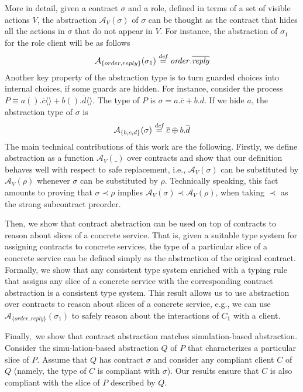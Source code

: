 \documentclass[submission,copyright,creativecommons]{eptcs}
\newcommand{\bydef}{\stackrel{\scriptstyle{\it def}}{=}}
\newcommand{\inp}[2]{#1(#2)}
\begin{document}
More in detail, given a contract $\sigma$  and a role, defined in terms of a set of visible actions $V$, 
the abstraction $\mathcal{A}_V(\sigma)$ of $\sigma$ can be thought as the contract that hides all the actions
in $\sigma$ that do not
appear in $V$. For instance, the abstraction of $\sigma_1$ for the role client will be as follows
\[
\mathcal{A}_{\{order, reply\}} (\sigma_1) \bydef {\it order}.\overline{\it reply}
\]
Another key property of the abstraction type is to turn guarded choices into internal choices, if some guards are hidden. For instance, consider the process $P \equiv \inp a{}.\overline c \langle \rangle + \inp b{}.\overline d \langle \rangle$. The type of $P$ is $\sigma = a.\overline c + b. \overline d$. If we hide $a$, the abstraction type of $\sigma$ is
\[ 
\mathcal{A}_{\{b,c,d\}} (\sigma) \bydef \overline c \oplus b. \overline d 
\]
The main technical contributions of this work are the following. Firstly, we define abstraction as a function $\mathcal{A}_V(\_)$ over contracts and show that our definition 
behaves well with respect to safe replacement, i.e.,  $\mathcal{A}_V(\sigma)$ can be substituted by $\mathcal{A}_V(\rho)$ 
whenever $\sigma$ can be substituted by $\rho$. Technically speaking, this fact amounts to proving that 
$\sigma \prec \rho$ implies $\mathcal{A}_V(\sigma)\prec \mathcal{A}_V(\rho)$,  when taking 
$\prec$ as the strong subcontract preorder.

Then, we show that contract abstraction can be used on top of contracts to reason about
 slices of a concrete service. That is, given a suitable type system for assigning 
contracts to concrete services, the type of a particular slice of a concrete 
service can be defined simply as the abstraction of the original contract. Formally, we 
show that any consistent type system enriched with a typing rule that assigns 
any slice of a concrete service with 
the corresponding contract abstraction is a consistent type system. This result allows us 
to use abstraction over contracts to reason about slices of a concrete service, e.g., we 
can use $\mathcal{A}_{\{order, reply\}} (\sigma_1)$ to safely reason about the interactions
of $C_1$ with a client. 
 
Finally,\   we show that contract abstraction matches simulation-based abstraction. Consider the 
simu-lation-based abstraction $Q$ 
of $P$ that characterizes a particular slice of $P$. Assume that $Q$ has contract $\sigma$ and 
consider any compliant client $C$ of $Q$ (namely, the type of $C$ is compliant with $\sigma$). Our 
results ensure that 
$C$ is also compliant with the slice of $P$ described by $Q$. 
\end{document}
